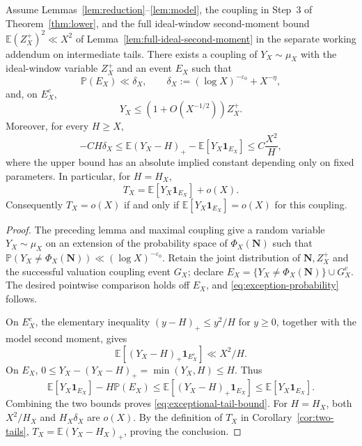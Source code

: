 \begin{proposition}
\label{prop:exceptional-mass}
Assume Lemmas~\ref{lem:reduction}--\ref{lem:model}, the coupling in
Step~3 of Theorem~\ref{thm:lower}, and the full ideal-window second-moment
bound $\mathbb E(Z_X^+)^2\ll X^2$ of
Lemma~\ref{lem:full-ideal-second-moment} in the separate working
addendum on intermediate tails.
There exists a coupling of $Y_X\sim\mu_X$ with the ideal-window
variable $Z_X^+$ and an event $E_X$ such that
\begin{equation}\label{eq:exception-probability}
 \mathbb P(E_X)\ll\delta_X,\qquad
 \delta_X:=(\log X)^{-\varepsilon_0}+X^{-\eta},
\end{equation}
and, on $E_X^c$,
\[
 Y_X\le(1+O(X^{-1/2}))Z_X^+.
\]
Moreover, for every $H\ge X$,
\begin{equation}\label{eq:exceptional-tail-bound}
 -C H\delta_X
 \le \mathbb E(Y_X-H)_+-\mathbb E[Y_X\mathbf1_{E_X}]
 \le C\frac{X^2}{H},
\end{equation}
where the upper bound has an absolute implied constant depending only on
fixed parameters. In particular, for $H=H_X$,
\begin{equation}\label{eq:exceptional-tail-asymptotic}
 \boxed{T_X=\mathbb E[Y_X\mathbf1_{E_X}]+o(X).}
\end{equation}
Consequently $T_X=o(X)$ if and only if
$\mathbb E[Y_X\mathbf1_{E_X}]=o(X)$ for this coupling.
\end{proposition}
\begin{proof}
The preceding lemma and maximal coupling give a random variable
$Y_X\sim\mu_X$ on an extension of the probability space of
$\Phi_X(\mathbf N)$ such that
$\mathbb P(Y_X\ne\Phi_X(\mathbf N))\ll(\log X)^{-\varepsilon_0}$.
Retain the joint distribution of $\mathbf N,Z_X^+$ and the successful
valuation coupling event $G_X$; declare
$E_X=\{Y_X\ne\Phi_X(\mathbf N)\}\cup G_X^c$.
The desired pointwise comparison holds off $E_X$, and
\eqref{eq:exception-probability} follows.

On $E_X^c$, the elementary inequality
$(y-H)_+\le y^2/H$ for $y\ge0$, together with the model second moment,
gives
\[
 \mathbb E[(Y_X-H)_+\mathbf1_{E_X^c}]
 \ll X^2/H.
\]
On $E_X$, $0\le Y_X-(Y_X-H)_+=\min(Y_X,H)\le H$. Thus
\[
 \mathbb E[Y_X\mathbf1_{E_X}]-H\mathbb P(E_X)
 \le\mathbb E[(Y_X-H)_+\mathbf1_{E_X}]
 \le\mathbb E[Y_X\mathbf1_{E_X}].
\]
Combining the two bounds proves \eqref{eq:exceptional-tail-bound}.
For $H=H_X$, both $X^2/H_X$ and $H_X\delta_X$ are $o(X)$.
By the definition of $T_X$ in Corollary~\ref{cor:two-tails},
$T_X=\mathbb E(Y_X-H_X)_+$, proving the conclusion.
\end{proof}

